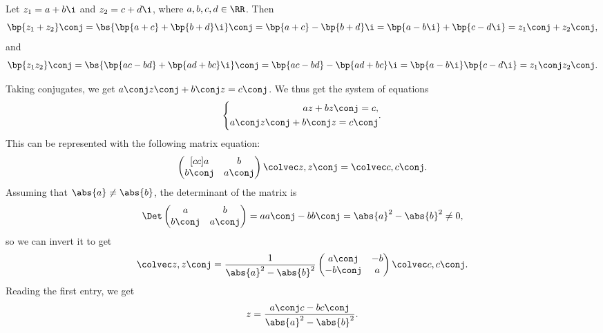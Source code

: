 \begin{solution}
    \begin{ppart}
        Let $z_1 = a + b \i$ and $z_2 = c + d\i$, where $a, b, c, d \in \RR$. Then \[\bp{z_1 + z_2}\conj = \bs{\bp{a + c} + \bp{b + d} \i }\conj = \bp{a + c} - \bp{b + d} \i = \bp{a - b \i} + \bp{c - d\i} = z_1\conj + z_2 \conj,\] and \[\bp{z_1 z_2}\conj = \bs{\bp{ac-bd} + \bp{ad + bc}\i}\conj = \bp{ac-bd} - \bp{ad + bc}\i = \bp{a - b\i}\bp{c - d\i} = z_1\conj z_2\conj.\]
    \end{ppart}
    \begin{ppart}
        Taking conjugates, we get $a\conj z\conj + b\conj z = c\conj$. We thus get the system of equations \[\left\{\begin{aligned}
            az + bz\conj = c,\\
            a\conj z\conj + b\conj z = c\conj
        \end{aligned}.\right.\] This can be represented with the following matrix equation:\[\begin{pmatrix}[cc]a & b \\ b\conj & a \conj\end{pmatrix}\cvecii{z}{z\conj} = \cvecii{c}{c\conj}.\] Assuming that $\abs{a} \neq \abs{b}$, the determinant of the matrix is \[\Det \begin{pmatrix}a & b \\ b\conj & a \conj\end{pmatrix} = aa\conj - bb\conj = \abs{a}^2 - \abs{b}^2 \neq 0,\] so we can invert it to get \[\cvecii{z}{z\conj} = \frac1{\abs{a}^2 - \abs{b}^2} \begin{pmatrix}a\conj & -b \\ -b\conj & a \end{pmatrix} \cvecii{c}{c\conj}.\] Reading the first entry, we get \[z = \frac{a\conj c - b c\conj}{\abs{a}^2 - \abs{b}^2}.\]
    \end{ppart}
    \begin{ppart}

\end{ppart}
\end{solution}
